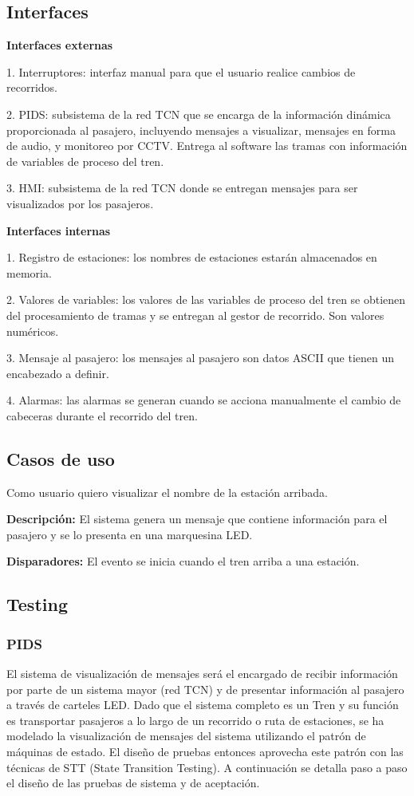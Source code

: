 \documentclass[
11pt, %
]{charter}
\begin{document}
\pagebreak
\subsection{Interfaces}
\textbf{Interfaces externas}

1. Interruptores: interfaz manual para que el usuario realice cambios de recorridos.

2. PIDS: subsistema de la red TCN que se encarga de la información dinámica proporcionada al pasajero, incluyendo mensajes a visualizar, mensajes en forma de audio, y monitoreo por CCTV. Entrega al software las tramas con información de variables de proceso del tren.

3. HMI: subsistema de la red TCN donde se entregan mensajes para ser visualizados por
los pasajeros.

\textbf{Interfaces internas}

1. Registro de estaciones: los nombres de estaciones estarán almacenados en memoria.

2. Valores de variables: los valores de las variables de proceso del tren se obtienen del procesamiento de tramas y se entregan al gestor de recorrido. Son valores numéricos.

3. Mensaje al pasajero: los mensajes al pasajero son datos ASCII que tienen un encabezado a definir.

4. Alarmas: las alarmas se generan cuando se acciona manualmente el cambio de cabeceras durante el recorrido del tren.

\subsection{Casos de uso}

Como usuario quiero visualizar el nombre de la estación arribada.

\textbf{Descripción:} El sistema genera un mensaje que contiene información para el pasajero y se lo presenta en una marquesina LED.

\textbf{Disparadores:} El evento se inicia cuando el tren arriba a una 
estación.

\subsection{Testing}

\subsubsection{PIDS}
El sistema de visualización de mensajes será el encargado de recibir información por parte de un sistema mayor (red TCN) y de presentar información al pasajero a través de carteles LED. Dado que el sistema completo es un Tren y su función es transportar pasajeros a lo largo de un recorrido o ruta de
estaciones, se ha modelado la visualización de mensajes del sistema  utilizando el patrón de máquinas de estado. El diseño de pruebas entonces aprovecha este patrón con las técnicas de STT
(State Transition Testing). A continuación se detalla paso a paso el diseño de las pruebas de sistema y de aceptación. 
\end{document}
